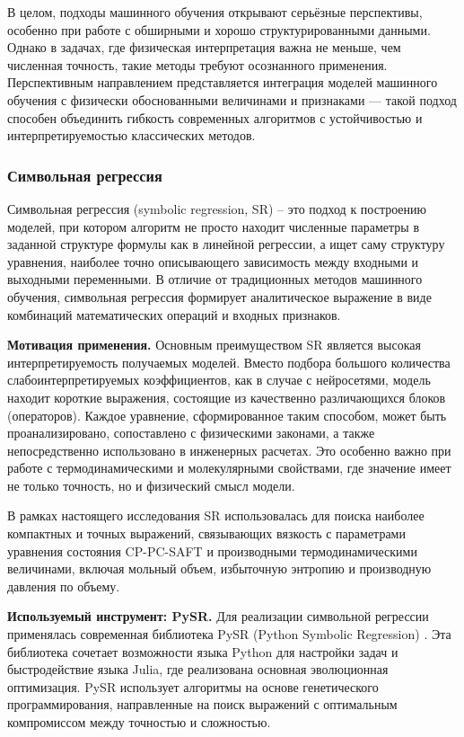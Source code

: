 \documentclass[a4paper,12pt]{article}
\begin{document}
      В целом, подходы машинного обучения открывают серьёзные перспективы, особенно при работе с обширными и хорошо структурированными данными. Однако в задачах, где физическая интерпретация важна не меньше, чем численная точность, такие методы требуют осознанного применения. Перспективным направлением представляется интеграция моделей машинного обучения с физически обоснованными величинами и признаками — такой подход способен объединить гибкость современных алгоритмов с устойчивостью и интерпретируемостью классических методов.

\subsubsection{Символьная регрессия}

Символьная регрессия (symbolic regression, SR) -- это подход к построению моделей, при котором алгоритм не просто находит численные параметры в заданной структуре формулы как в линейной регрессии, а ищет саму структуру уравнения, наиболее точно описывающего зависимость между входными и выходными переменными. В отличие от традиционных методов машинного обучения, символьная регрессия формирует аналитическое выражение в виде комбинаций математических операций и входных признаков.

\textbf{Мотивация применения.}
Основным преимуществом SR является высокая интерпретируемость получаемых моделей. Вместо подбора большого количества слабоинтерпретируемых коэффициентов, как в случае с нейросетями, модель находит короткие выражения, состоящие из качественно различающихся блоков (операторов). Каждое уравнение, сформированное таким способом, может быть проанализировано, сопоставлено с физическими законами, а также непосредственно использовано в инженерных расчетах. Это особенно важно при работе с термодинамическими и молекулярными свойствами, где значение имеет не только точность, но и физический смысл модели.

В рамках настоящего исследования SR использовалась для поиска наиболее компактных и точных выражений, связывающих вязкость с параметрами уравнения состояния CP-PC-SAFT и производными термодинамическими величинами, включая мольный объем, избыточную энтропию и производную давления по объему.

\textbf{Используемый инструмент: PySR.}
Для реализации символьной регрессии применялась современная библиотека PySR (Python Symbolic Regression) \cite{cranmer2023pysr}. Эта библиотека сочетает возможности языка Python для настройки задач и быстродействие языка Julia, где реализована основная эволюционная оптимизация. PySR использует алгоритмы на основе генетического программирования, направленные на поиск выражений с оптимальным компромиссом между точностью и сложностью.
\end{document}
